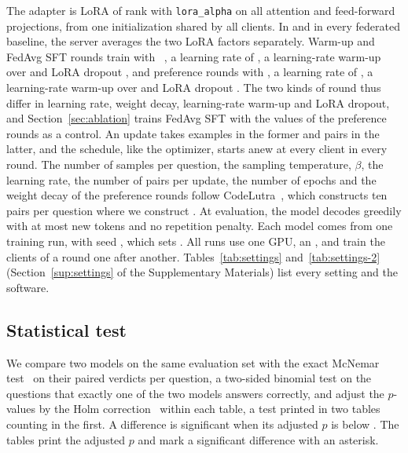 The adapter is LoRA of rank  with \texttt{lora\_alpha}
 on all attention and feed-forward projections,
from one initialization shared by all clients. In \method{} and in every
federated baseline, the server averages the two LoRA factors
separately. Warm-up and FedAvg SFT
rounds train with ~\cite{loshchilov2019adamw}, a
learning rate of , a learning-rate warm-up over
 and LoRA dropout , and
preference rounds with , a learning rate of
, a learning-rate warm-up over 
and LoRA dropout . The two kinds of round thus
differ in learning rate, weight decay, learning-rate warm-up and LoRA
dropout, and Section~\ref{sec:ablation} trains FedAvg SFT with the values
of the preference rounds as a control. An update takes  examples in the
former and  pairs in the latter, and the schedule,
like the optimizer, starts anew at every client in every round. The
number of samples per question, the sampling
temperature, $\beta$, the learning rate, the number of pairs per update,
the number of epochs and the weight decay of the preference rounds
follow CodeLutra~\cite{tao2024codelutra}, which constructs ten pairs per
question where we construct . At evaluation, the
model decodes greedily with at most  new tokens and
no repetition penalty. Each model comes from one training run, with
seed , which sets . All runs use one GPU,
an , and train the clients of a round one after another.
Tables~\ref{tab:settings} and~\ref{tab:settings-2} (Section~\ref{sup:settings} of the Supplementary Materials) list every
setting and the software.

\subsection{Statistical test}\label{sec:stat-test}

We compare two models on the same evaluation set with the exact McNemar
test~\cite{mcnemar1947note} on their paired verdicts per question, a
two-sided binomial test on the questions that exactly one of the two
models answers correctly, and adjust the $p$-values by the Holm
correction~\cite{holm1979simple} within each table, a test printed in two
tables counting in the first. A difference is significant when its
adjusted $p$ is below . The tables print the adjusted
$p$ and mark a significant difference with an asterisk.
